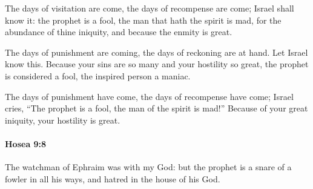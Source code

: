 			\begin{versebox}
					\item[BHS] 
					\item[LXX] 
					\item[ASV] The days of visitation are come, the days of recompense are come; Israel shall know it: the prophet is a fool, the man that hath the spirit is mad, for the abundance of thine iniquity, and because the enmity is great.
					\item[NIV] The days of punishment are coming, the days of reckoning are at hand. Let Israel know this. Because your sins are so many and your hostility so great, the prophet is considered a fool, the inspired person a maniac.
					\item[NRSV] The days of punishment have come, the days of recompense have come; Israel cries, “The prophet is a fool, the man of the spirit is mad!” Because of your great iniquity, your hostility is great.
			\end{versebox}

		\paragraph{Hosea 9:8} %
			\label{HOSEA-9-8}

			The watchman of Ephraim was with my God: but the prophet is a snare of a fowler in all his ways, and hatred in the house of his God.

